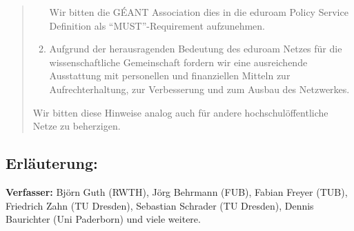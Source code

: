 \documentclass[12pt,oneside]{scrartcl}
\begin{document}
\begin{quote}
\begin{enumerate}
    Wir bitten die GÉANT Association dies in die eduroam Policy Service Definition
    als ``MUST''-Requirement aufzunehmen.

  \item Aufgrund der herausragenden Bedeutung des eduroam Netzes für die
    wissenschaftliche Gemeinschaft fordern wir eine ausreichende Ausstattung mit
    personellen und finanziellen Mitteln zur Aufrechterhaltung, zur Verbesserung
    und zum Ausbau des Netzwerkes.
  \end{enumerate}

  Wir bitten diese Hinweise analog auch für andere hochschulöffentliche Netze zu
  beherzigen.

\end{quote}

\subsection*{Erläuterung:}

\vspace{1cm}
\textbf{Verfasser:} Björn Guth (RWTH), Jörg Behrmann (FUB), Fabian Freyer (TUB),
Friedrich Zahn (TU Dresden), Sebastian Schrader (TU Dresden), Dennis Baurichter (Uni Paderborn)
und viele weitere.
\end{document}
